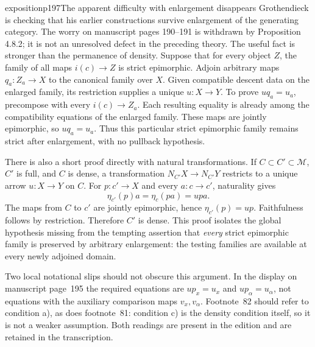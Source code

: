 \begin{dcomment}{exposition}{p197}{The apparent difficulty with enlargement disappears}
Grothendieck is checking that his earlier constructions survive enlargement of the generating category. The worry on manuscript pages 190--191 is withdrawn by Proposition 4.8.2; it is not an unresolved defect in the preceding theory. The useful fact is stronger than the permanence of density. Suppose that for every object $Z$, the family of all maps $i(c)\to Z$ is strict epimorphic. Adjoin arbitrary maps $q_a:Z_a\to X$ to the canonical family over $X$. Given compatible descent data on the enlarged family, its restriction supplies a unique $u:X\to Y$. To prove $uq_a=u_a$, precompose with every $i(c)\to Z_a$. Each resulting equality is already among the compatibility equations of the enlarged family. These maps are jointly epimorphic, so $uq_a=u_a$. Thus this particular strict epimorphic family remains strict after enlargement, with no pullback hypothesis.

There is also a short proof directly with natural transformations. If $C\subset C'\subset\mathcal M$, $C'$ is full, and $C$ is dense, a transformation $N_{C'}X\to N_{C'}Y$ restricts to a unique arrow $u:X\to Y$ on $C$. For $p:c'\to X$ and every $a:c\to c'$, naturality gives
\[
 \eta_{c'}(p)a=\eta_c(pa)=upa.
\]
The maps from $C$ to $c'$ are jointly epimorphic, hence $\eta_{c'}(p)=up$. Faithfulness follows by restriction. Therefore $C'$ is dense. This proof isolates the global hypothesis missing from the tempting assertion that \emph{every} strict epimorphic family is preserved by arbitrary enlargement: the testing families are available at every newly adjoined domain.

Two local notational slips should not obscure this argument. In the display on manuscript page~195 the required equations are $up_x=u_x$ and $up_\alpha=u_\alpha$, not equations with the auxiliary comparison maps $v_x,v_\alpha$. Footnote~82 should refer to condition a), as does footnote~81: condition c) is the density condition itself, so it is not a weaker assumption. Both readings are present in the edition and are retained in the transcription.
\end{dcomment}

